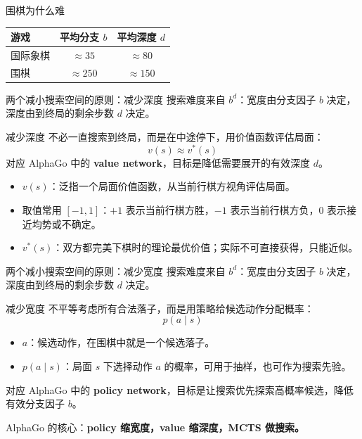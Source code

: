 \documentclass[UTF8,aspectratio=169,10pt]{ctexbeamer}
\begin{document}
\begin{frame}{围棋为什么难}
  \vspace{-0.15cm}
  \begin{center}
    \begin{tabular}{lcc}
      \toprule
      游戏 & 平均分支 $b$ & 平均深度 $d$ \\
      \midrule
      国际象棋 & $\approx 35$ & $\approx 80$ \\
      围棋 & $\approx 250$ & $\approx 150$ \\
      \bottomrule
    \end{tabular}
  \end{center}
\end{frame}

\begin{frame}{两个减小搜索空间的原则：减少深度}
  搜索难度来自 $b^d$：宽度由分支因子 $b$ 决定，深度由到终局的剩余步数 $d$ 决定。

  \begin{block}{减少深度}
    不必一直搜索到终局，而是在中途停下，用价值函数评估局面：
    \[
      v(s) \approx v^*(s)
    \]
    对应 AlphaGo 中的 \textbf{value network}，目标是降低需要展开的有效深度 $d$。
  \end{block}

  \vspace{0.05cm}
  \begin{itemize}
    \item $v(s)$：泛指一个局面价值函数，从当前行棋方视角评估局面。
    \item 取值常用 $[-1,1]$：$+1$ 表示当前行棋方胜，$-1$ 表示当前行棋方负，$0$ 表示接近均势或不确定。
    \item $v^*(s)$：双方都完美下棋时的理论最优价值；实际不可直接获得，只能近似。
  \end{itemize}
\end{frame}

\begin{frame}{两个减小搜索空间的原则：减少宽度}
  搜索难度来自 $b^d$：宽度由分支因子 $b$ 决定，深度由到终局的剩余步数 $d$ 决定。

  \begin{block}{减少宽度}
    不平等考虑所有合法落子，而是用策略给候选动作分配概率：
    \[
      p(a\mid s)
    \]
    \begin{itemize}
      \item $a$：候选动作，在围棋中就是一个候选落子。
      \item $p(a\mid s)$：局面 $s$ 下选择动作 $a$ 的概率，可用于抽样，也可作为搜索先验。
    \end{itemize}
    对应 AlphaGo 中的 \textbf{policy network}，目标是让搜索优先探索高概率候选，降低有效分支因子 $b$。
  \end{block}

  \begin{center}
    \large
    AlphaGo 的核心：\textbf{policy 缩宽度，value 缩深度，MCTS 做搜索。}
  \end{center}
\end{frame}
\end{document}
